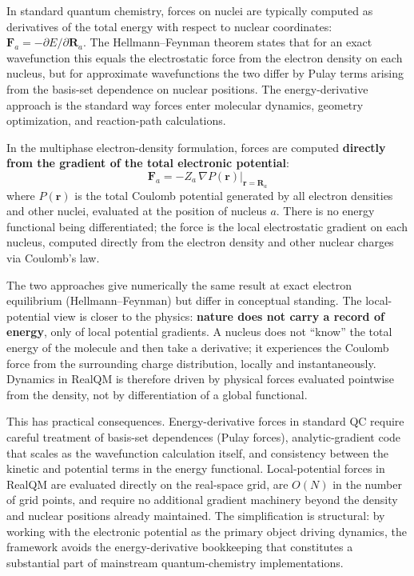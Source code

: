 \documentclass[11pt]{article}
\begin{document}
In standard quantum chemistry, forces on nuclei are typically computed as derivatives of the total energy with respect to nuclear coordinates: $\mathbf{F}_a = -\partial E / \partial \mathbf{R}_a$. The Hellmann--Feynman theorem states that for an exact wavefunction this equals the electrostatic force from the electron density on each nucleus, but for approximate wavefunctions the two differ by Pulay terms arising from the basis-set dependence on nuclear positions. The energy-derivative approach is the standard way forces enter molecular dynamics, geometry optimization, and reaction-path calculations.

In the multiphase electron-density formulation, forces are computed \textbf{directly from the gradient of the total electronic potential}:
\begin{equation}
\mathbf{F}_a = -Z_a \, \nabla P(\mathbf{r}) \big|_{\mathbf{r} = \mathbf{R}_a}
\end{equation}
where $P(\mathbf{r})$ is the total Coulomb potential generated by all electron densities and other nuclei, evaluated at the position of nucleus $a$. There is no energy functional being differentiated; the force is the local electrostatic gradient on each nucleus, computed directly from the electron density and other nuclear charges via Coulomb's law.

The two approaches give numerically the same result at exact electron equilibrium (Hellmann--Feynman) but differ in conceptual standing. The local-potential view is closer to the physics: \textbf{nature does not carry a record of energy}, only of local potential gradients. A nucleus does not ``know'' the total energy of the molecule and then take a derivative; it experiences the Coulomb force from the surrounding charge distribution, locally and instantaneously. Dynamics in RealQM is therefore driven by physical forces evaluated pointwise from the density, not by differentiation of a global functional.

This has practical consequences. Energy-derivative forces in standard QC require careful treatment of basis-set dependences (Pulay forces), analytic-gradient code that scales as the wavefunction calculation itself, and consistency between the kinetic and potential terms in the energy functional. Local-potential forces in RealQM are evaluated directly on the real-space grid, are $O(N)$ in the number of grid points, and require no additional gradient machinery beyond the density and nuclear positions already maintained. The simplification is structural: by working with the electronic potential as the primary object driving dynamics, the framework avoids the energy-derivative bookkeeping that constitutes a substantial part of mainstream quantum-chemistry implementations.
\end{document}
